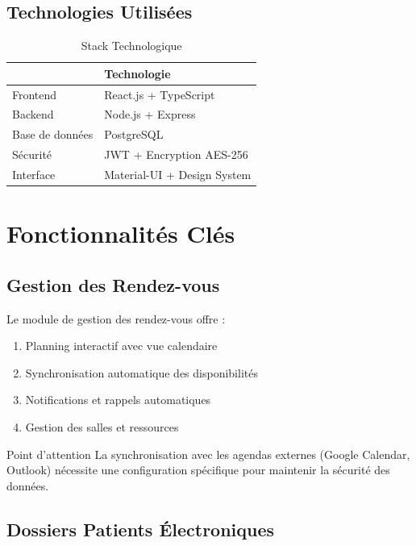 \documentclass{modern-report}
\begin{document}
\subsection{Technologies Utilisées}

\begin{table}[h]
\centering
\caption{Stack Technologique}
\begin{tabular}{@{}ll@{}}
\toprule
\moderntablehead{Composant & Technologie} \\
\midrule
Frontend & React.js + TypeScript \\
Backend & Node.js + Express \\
Base de données & PostgreSQL \\
Sécurité & JWT + Encryption AES-256 \\
Interface & Material-UI + Design System \\
\bottomrule
\end{tabular}
\end{table}

\section{Fonctionnalités Clés}

\subsection{Gestion des Rendez-vous}

Le module de gestion des rendez-vous offre :

\begin{enumerate}
    \item Planning interactif avec vue calendaire
    \item Synchronisation automatique des disponibilités
    \item Notifications et rappels automatiques
    \item Gestion des salles et ressources
\end{enumerate}

\begin{warningbox}{Point d'attention}
La synchronisation avec les agendas externes (Google Calendar, Outlook) nécessite une configuration spécifique pour maintenir la sécurité des données.
\end{warningbox}

\subsection{Dossiers Patients Électroniques}
\end{document}
